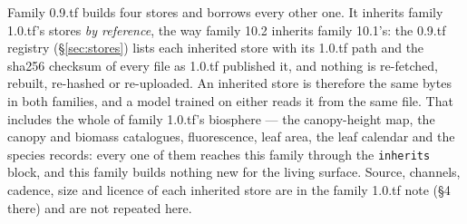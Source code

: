 \documentclass[10pt]{article}
\newcommand{\code}[1]{\texttt{#1}}
\begin{document}
Family 0.9.tf builds four stores and borrows every other one. It inherits
family 1.0.tf's stores \emph{by reference}, the way family 10.2 inherits
family 10.1's: the 0.9.tf registry (\S\ref{sec:stores}) lists each inherited
store with its 1.0.tf path and the sha256 checksum of every file as 1.0.tf
published it, and nothing is re-fetched, rebuilt, re-hashed or re-uploaded.
An inherited store is therefore the same bytes in both families, and a model
trained on either reads it from the same file. That includes the whole of
family 1.0.tf's biosphere --- the canopy-height map, the canopy and biomass
catalogues, fluorescence, leaf area, the leaf calendar and the species
records: every one of them reaches this family through the \code{inherits}
block, and this family builds nothing new for the living surface. Source, channels, cadence,
size and licence of each inherited store are in the family 1.0.tf note
(\S4 there) and are not repeated here.
\end{document}
